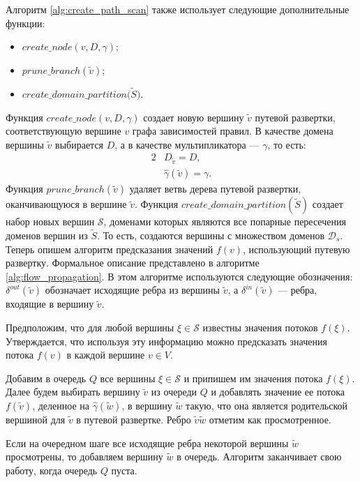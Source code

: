 \documentclass[../thesis.tex]{subfiles}
\begin{document}
Алгоритм \ref{alg:create_path_scan} также использует следующие дополнительные функции:
\begin{itemize}
    \item $create\_node(v, D, \gamma)$;
    \item $prune\_branch(\tilde{v})$;
    \item $create\_domain\_partition\big(\widetilde{S}\big)$.
\end{itemize}


Функция $create\_node(v, D, \gamma)$ создает новую вершину $\widetilde{v}$ путевой развертки, соответствующую вершине $v$ графа зависимостей правил.
В качестве домена вершины $\tilde{v}$ выбирается $D$, а в качестве мультипликатора --- $\gamma$, то есть:
\begin{alignat}{2}
    &D_{\widetilde{v}} = D, \\
    &\hat{\gamma}(\tilde{v}) = \gamma.
\end{alignat}
Функция $prune\_branch(\tilde{v})$ удаляет ветвь дерева путевой развертки, оканчивающуюся в вершине $\tilde{v}$.
Функция $create\_domain\_partition(\widetilde{S})$ создает набор новых вершин $\mathscr{S}$, доменами которых являются все попарные пересечения доменов вершин из $\widetilde{S}$.
То есть, создаются вершины с множеством доменов $\mathscr{D}_s$.
\\

Теперь опишем алгоритм предсказания значений $f(v)$, использующий путевую развертку.
Формальное описание представлено в алгоритме \ref{alg:flow_propagation}.
В этом алгоритме используются следующие обозначения: $\delta^{out}(\tilde{v})$ обозначает исходящие ребра из вершины $\tilde{v}$, а $\delta^{in}(\tilde{v})$ --- ребра, входящие в вершину $\tilde{v}$.

Предположим, что для любой вершины $\xi\in \mathscr{S}$ известны значения потоков $f(\xi)$.
Утверждается, что используя эту информацию можно предсказать значения потока $f(v)$ в каждой вершине $v\in V$.

Добавим в очередь $Q$ все вершины $\xi\in \mathscr{S}$ и припишем им значения потока $f(\xi)$.
Далее будем выбирать вершину $\tilde{v}$ из очереди $Q$ и добавлять значение ее потока $f(\tilde{v})$, деленное на $\hat{\gamma}(\tilde{w})$, в вершину $\tilde{w}$ такую, что она является родительской вершиной для $\tilde{v}$ в путевой развертке.
Ребро $\tilde{v}\tilde{w}$ отметим как просмотренное.

Если на очередном шаге все исходящие ребра некоторой вершины $\tilde{w}$ просмотрены, то добавляем вершину $\tilde{w}$ в очередь.
Алгоритм заканчивает свою работу, когда очередь $Q$ пуста.
\end{document}
